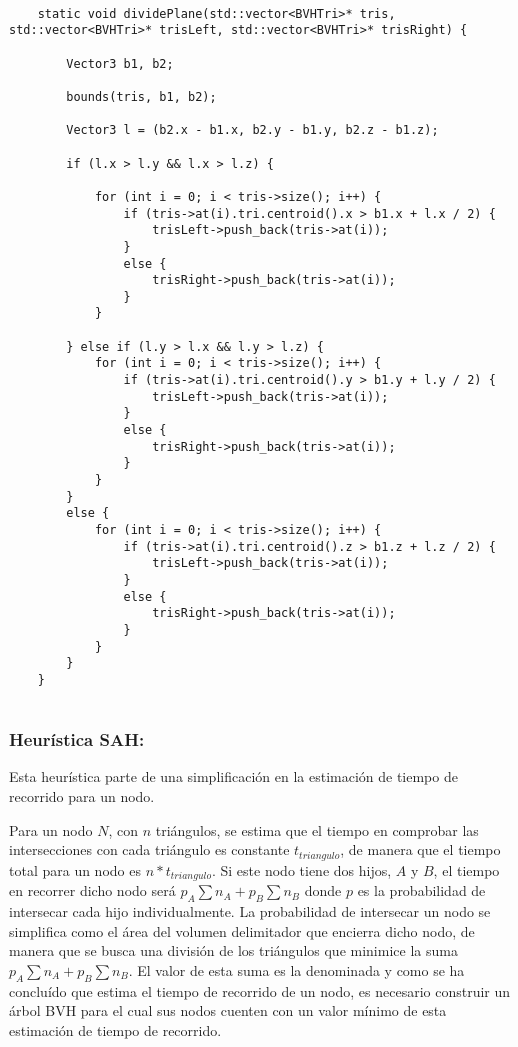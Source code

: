 \begin{minipage}[c]{0.95\textwidth}
\begin{lstlisting}[label={cod:planeheuristic}, caption={Heurística de división de plano}]
	
	static void dividePlane(std::vector<BVHTri>* tris, std::vector<BVHTri>* trisLeft, std::vector<BVHTri>* trisRight) {

		Vector3 b1, b2;

		bounds(tris, b1, b2);

		Vector3 l = (b2.x - b1.x, b2.y - b1.y, b2.z - b1.z);

		if (l.x > l.y && l.x > l.z) {

			for (int i = 0; i < tris->size(); i++) {
				if (tris->at(i).tri.centroid().x > b1.x + l.x / 2) {
					trisLeft->push_back(tris->at(i));
				}
				else {
					trisRight->push_back(tris->at(i));
				}
			}

		} else if (l.y > l.x && l.y > l.z) {
			for (int i = 0; i < tris->size(); i++) {
				if (tris->at(i).tri.centroid().y > b1.y + l.y / 2) {
					trisLeft->push_back(tris->at(i));
				}
				else {
					trisRight->push_back(tris->at(i));
				}
			}
		}
		else {
			for (int i = 0; i < tris->size(); i++) {
				if (tris->at(i).tri.centroid().z > b1.z + l.z / 2) {
					trisLeft->push_back(tris->at(i));
				}
				else {
					trisRight->push_back(tris->at(i));
				}
			}
		}
	}
	
\end{lstlisting}
\end{minipage}

\subsubsection{Heurística SAH:}
\label{sub:sah}	

Esta heurística parte de una simplificación en la estimación de tiempo de recorrido para un nodo.

Para un nodo $N$, con $n$ triángulos, se estima que el tiempo en comprobar las intersecciones con cada triángulo es constante $t_{triangulo}$, de manera que el tiempo total para un nodo es $n * t_{triangulo}$. Si este nodo tiene dos hijos, $A$ y $B$, el tiempo en recorrer dicho nodo será $p_A\sum{n_A} + p_B\sum{n_B}$ donde $p$ es la probabilidad de intersecar cada hijo individualmente. La probabilidad de intersecar un nodo se simplifica como el área del volumen delimitador que encierra dicho nodo, de manera que se busca una división de los triángulos que minimice la suma $p_A\sum{n_A} + p_B\sum{n_B}$. El valor de esta suma es la denominada  y como se ha concluído que estima el tiempo de recorrido de un nodo, es necesario construir un árbol BVH para el cual sus nodos cuenten con un valor mínimo de esta estimación de tiempo de recorrido.

